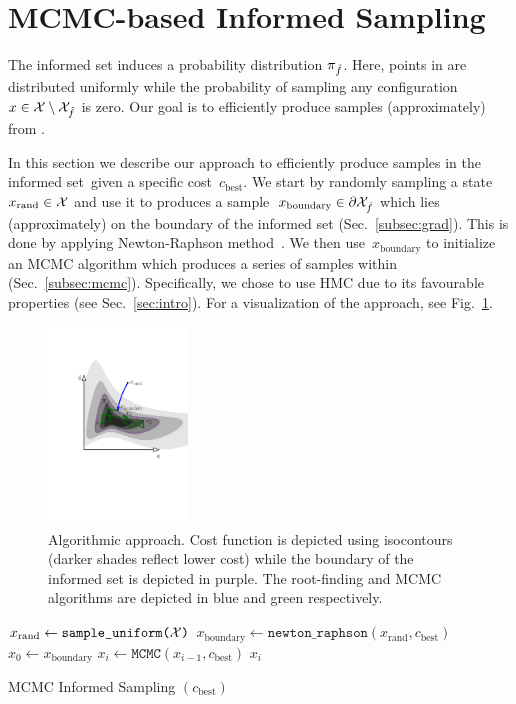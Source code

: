 \documentclass[letterpaper, 10 pt, conference]{ieeeconf}  %
\begin{document}
\section{MCMC-based Informed Sampling}
The informed set induces a probability distribution $\pi_{\hat{f}}$. 
Here, points in \Cinf are distributed uniformly
while 
the probability of sampling any configuration $x \in \mathcal{X} \setminus \mathcal{X}_{\hat{f}}$ is zero.
Our goal is to efficiently produce samples (approximately) from \Pinf.



In this section we describe our approach to efficiently produce samples in the informed set~\Cinf given a specific cost~$c_{\text{best}}$.
We start  by randomly sampling a state~$x_\text{rand} \in \mathcal{X}$ and use it
to produces a sample~$x_\text{boundary} \in \partial\mathcal{X}_{\hat{f}}$ which lies (approximately) on the boundary of the informed set (Sec.~\ref{subsec:grad}).
This is done by applying Newton-Raphson method~\cite{RT06}.
We then use~$x_\text{boundary}$ to initialize an MCMC algorithm which produces a series of samples within \Cinf (Sec.~\ref{subsec:mcmc}). Specifically, we chose to use HMC due to its favourable properties (see Sec.~\ref{sec:intro}). 
For a visualization of the approach, see Fig.~\ref{fig:alg}.

\begin{figure}[tb]
  \centering
  	\includegraphics[trim={4.5cm 0 4cm 2cm},clip,height = 5.25cm ]{fig/alg.pdf}
  \caption{
    \captionstyle
  	Algorithmic approach.
  	Cost function is depicted using isocontours (darker shades reflect lower cost) while the boundary of the informed set is depicted in purple. 
  	The root-finding and MCMC algorithms are depicted in blue and green respectively.
  	}
   	\label{fig:alg}
\end{figure}

\begin{algorithm}[t]
	\begin{algorithmic}[1]
		\STATE $x_{\text{rand}} \leftarrow \texttt{sample\_uniform(\ensuremath{\mathcal{X}})}$
		\STATE $x_{\text{boundary}} \leftarrow
		 \texttt{newton\_raphson}(x_{\text{rand}}, c_{\text{best}})$
		\STATE $x_{0} \leftarrow x_{\text{boundary}}$
			\STATE $x_{i} \leftarrow \texttt{MCMC} (x_{i-1}, c_{\text{best}})$
			\RETURN $x_{i}$
		\ENDFOR
		 
   	\end{algorithmic}
	\caption{MCMC Informed Sampling $(c_{\text{best}})$}
	\label{alg:mcmc_informed_sampling}	
\end{algorithm}
\end{document}
